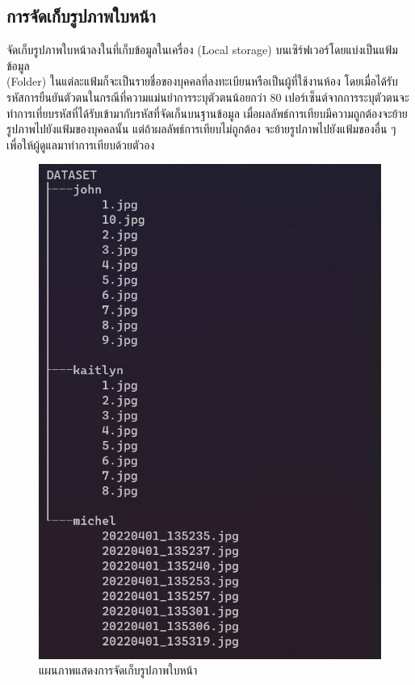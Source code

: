 \subsection{การจัดเก็บรูปภาพใบหน้า}
จัดเก็บรูปภาพใบหน้าลงในที่เก็บข้อมูลในเครื่อง (Local storage) บนเซิร์ฟเวอร์โดยแบ่งเป็นแฟ้มข้อมูล \\(Folder) 
ในแต่ละแฟ้มก็จะเป็นรายชื่อของบุคคลที่ลงทะเบียนหรือเป็นผู้ที่ใช้งานห้อง 
โดยเมื่อได้รับรหัสการยืนยันตัวตนในกรณีที่ความแม่นยำการระบุตัวตนน้อยกว่า 80 เปอร์เซ็นต์จากการระบุตัวตนจะทำการเที่ยบรหัสที่ได้รับเข้ามากับรหัสที่จัดเก็นบนฐานข้อมูล 
เมื่อผลลัพธ์การเทียบมีความถูกต้องจะย้ายรูปภาพไปยังแฟ้มของบุคคลนั้น แต่ถ้าผลลัพธ์การเทียบไม่ถูกต้อง
จะย้ายรูปภาพไปยังแฟ้มของอื่น ๆ เพื่อให้ผู้ดูแลมาทำการเทียบด้วยตัวอง

\begin{figure}[ht]
  \begin{center}
    \includegraphics[scale=.5]{pic/dataset.png}
  \caption[แผนภาพแสดงการจัดเก็บรูปภาพใบหน้า]{แผนภาพแสดงการจัดเก็บรูปภาพใบหน้า}
  \end{center}
  \label{fig:folder}
\end{figure}



